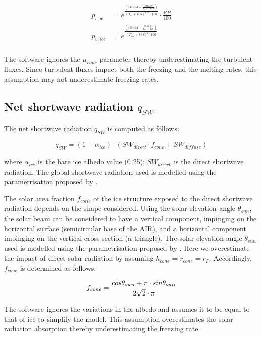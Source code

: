 \documentclass[tc, manuscript]{copernicus}
\begin{document}
\begin{equation}
	\begin{split}
		p_{v,w}&=e^{\frac{(34.494 - \frac{4924.99}{T_{a} + 237.1})}{(T_a + 105)^{1.57} \cdot 100}} \cdot \frac{RH}{100} \\
		p_{v,ice}&=e^{\frac{(43.494 - \frac{6545.89}{T_{ice} + 278})}{(T_{ice} + 868)^{2} \cdot 100}} \\
	\end{split} \label{eqn:vp}
\end{equation}

The software ignores the $\mu_{cone}$ parameter thereby underestimating the turbulent fluxes. Since turbulent
fluxes impact both the freezing and the melting rates, this assumption may not underestimate freezing rates.

\subsection{Net shortwave radiation \texorpdfstring{$q_{SW}$}{Lg}}
\label{sec:SW}

The net shortwave radiation $q_{SW}$ is computed as follows:

\begin{equation} q_{SW} = (1- \alpha_{ice}) \cdot ( SW_{direct} \cdot f_{cone} + SW_{diffuse})
\label{eqn:SW} \end{equation}

where $\alpha_{ice}$ is the bare ice albedo value (0.25); $SW_{direct}$ is the direct shortwave radiation. The
global shortwave radiation used is modelled using the parametrisation proposed by \cite{woolfComputationSolarElevation1968}.

The solar area fraction $f_{cone}$ of the ice structure exposed to the direct shortwave radiation depends on the
shape considered. Using the solar elevation angle $\theta_{sun}$, the solar beam can be considered to have a
vertical component, impinging on the horizontal surface (semicircular base of the AIR), and a horizontal
component impinging on the vertical cross section (a triangle). The solar elevation angle $\theta_{sun}$ used is
modelled using the parametrisation proposed by \cite{woolfComputationSolarElevation1968}. Here we overestimate the impact of direct
solar radiation by assuming $h_{cone} = r_{cone} = r_{F}$. Accordingly, $f_{cone}$ is determined as follows:

\begin{equation}
	\begin{split}
		f_{cone}& =\frac{ cos \theta_{sun} + \pi \cdot sin \theta_{sun} }{2\sqrt{2} \cdot \pi }\\
	\end{split}
	\label{ eqn:f_{cone}}
\end{equation}

The software ignores the variations in the albedo and assumes it to be equal to that of ice to simplify the
model. This assumption overestimates the solar radiation absorption thereby underestimating the freezing rate.

\noappendix       %


\end{document}

